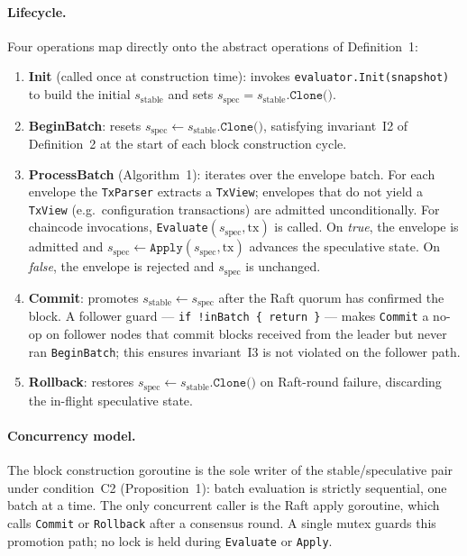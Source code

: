 \paragraph{Lifecycle.}
Four operations map directly onto the abstract operations of Definition~1:
\begin{enumerate}
  \item \textbf{Init} (called once at construction time): invokes
    \texttt{evaluator.Init(snapshot)} to build the initial $s_\text{stable}$
    and sets $s_\text{spec} = s_\text{stable}.\texttt{Clone()}$.
  \item \textbf{BeginBatch}: resets $s_\text{spec} \leftarrow
    s_\text{stable}.\texttt{Clone()}$, satisfying invariant~I2 of
    Definition~2 at the start of each block construction cycle.
  \item \textbf{ProcessBatch} (Algorithm~1): iterates over the envelope
    batch.  For each envelope the \texttt{TxParser} extracts a
    \texttt{TxView}; envelopes that do not yield a \texttt{TxView} (e.g.\
    configuration transactions) are admitted unconditionally.  For chaincode
    invocations, \texttt{Evaluate}$(s_\text{spec}, \mathrm{tx})$ is called.
    On \emph{true}, the envelope is admitted and $s_\text{spec}
    \leftarrow \texttt{Apply}(s_\text{spec}, \mathrm{tx})$ advances the
    speculative state.  On \emph{false}, the envelope is rejected and
    $s_\text{spec}$ is unchanged.
  \item \textbf{Commit}: promotes $s_\text{stable} \leftarrow s_\text{spec}$
    after the Raft quorum has confirmed the block.  A follower guard —
    \texttt{if !inBatch \{ return \}} — makes \texttt{Commit} a no-op on
    follower nodes that commit blocks received from the leader but never
    ran \texttt{BeginBatch}; this ensures invariant~I3 is not violated
    on the follower path.
  \item \textbf{Rollback}: restores $s_\text{spec} \leftarrow
    s_\text{stable}.\texttt{Clone()}$ on Raft-round failure, discarding the
    in-flight speculative state.
\end{enumerate}

\paragraph{Concurrency model.}
The block construction goroutine is the sole writer of the stable/speculative
pair under condition~C2 (Proposition~1): batch evaluation is strictly
sequential, one batch at a time.  The only concurrent caller is the Raft apply
goroutine, which calls \texttt{Commit} or \texttt{Rollback} after a consensus
round.  A single mutex guards this promotion path; no lock is held during
\texttt{Evaluate} or \texttt{Apply}.

